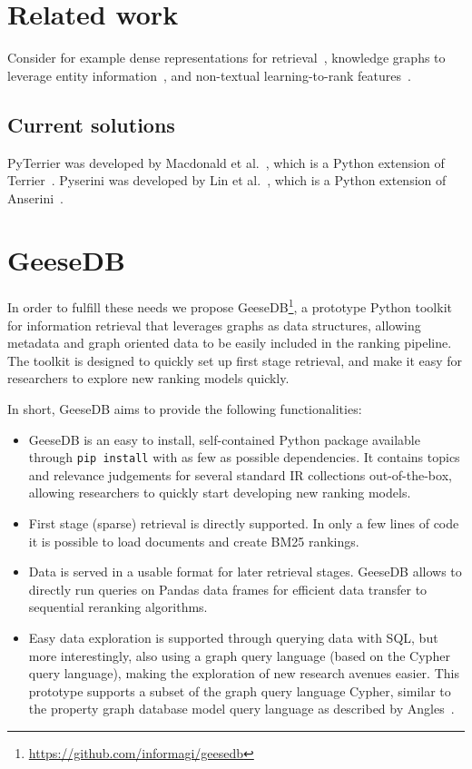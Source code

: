 \section{Related work }
Consider for example dense representations for retrieval~\cite{dense-retrieval-1, dense-retrieval-2, dense-retrieval-3}, knowledge graphs to leverage entity information~\cite{entity-1, entity-2, entity-3}, and non-textual learning-to-rank features~\cite{ltr-1, ltr-2}.

\subsection{Current solutions}
PyTerrier was developed by Macdonald et al.~\cite{pyterrier}, which is a Python extension of Terrier~\cite{terrier}. 
Pyserini was developed by Lin et al.~\cite{pyserini}, which is a Python extension of Anserini~\cite{anserini}.

\section{GeeseDB}
In order to fulfill these needs we propose GeeseDB\footnote{\url{https://github.com/informagi/geesedb}}, a prototype Python toolkit for information retrieval that leverages graphs as data structures, allowing metadata and graph oriented data to be easily included in the ranking pipeline. The toolkit is designed to quickly set up first stage retrieval, and make it easy for researchers to explore new ranking models quickly. 

In short, GeeseDB aims to provide the following functionalities:
\begin{itemize}
	\item GeeseDB is an easy to install, self-contained Python package available through \texttt{pip install} with as few as possible dependencies. It contains topics and relevance judgements for several standard IR collections out-of-the-box, allowing researchers to quickly start developing new ranking models. 
	\item First stage (sparse) retrieval is directly supported. In only a few lines of code it is possible to load documents and create BM25 rankings. 
	\item Data is served in a usable format for later retrieval stages. GeeseDB allows to directly run queries on Pandas data frames for efficient data transfer to sequential reranking algorithms.
	\item Easy data exploration is supported through querying data with SQL, but more interestingly, also using a graph query language (based on the Cypher query language), making the exploration of new research avenues easier. This prototype supports a subset of the graph query language Cypher, similar to the property graph database model query language as described by Angles~\cite{angles2018property}.
\end{itemize}

